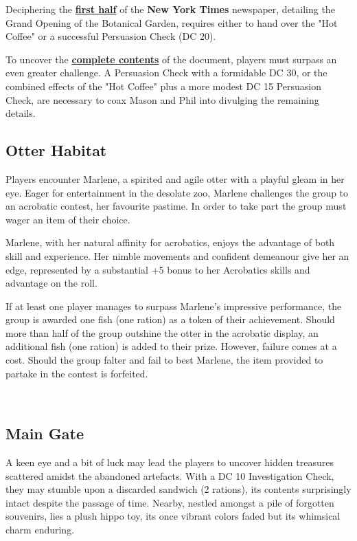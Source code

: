 Deciphering the \hyperref[sec:HalfDecipheredNewspaper]{\textbf{first half}} of the \textbf{New York Times} newspaper, detailing the Grand Opening of the Botanical Garden, requires either to hand over the "Hot Coffee" or a successful Persuasion Check (DC 20).

To uncover the \hyperref[sec:DecipheredNewspaper]{\textbf{complete contents}} of the document, players must surpass an even greater challenge. A Persuasion Check with a formidable DC 30, or the combined effects of the "Hot Coffee" plus a more modest DC 15 Persuasion Check, are necessary to coax Mason and Phil into divulging the remaining details.
\subsection*{ Otter Habitat}
Players encounter Marlene, a spirited and agile otter with a playful gleam in her eye. Eager for entertainment in the desolate zoo, Marlene challenges the group to an acrobatic contest, her favourite pastime. In order to take part the group must wager an item of their choice. 

Marlene, with her natural affinity for acrobatics, enjoys the advantage of both skill and experience. Her nimble movements and confident demeanour give her an edge, represented by a substantial +5 bonus to her Acrobatics skills and advantage on the roll.

If at least one player manages to surpass Marlene's impressive performance, the group is awarded one fish (one ration) as a token of their achievement. Should more than half of the group outshine the otter in the acrobatic display, an additional fish (one ration) is added to their prize. However, failure comes at a cost. Should the group falter and fail to best Marlene, the item provided to partake in the contest is forfeited.

\hfill\\\eject
\subsection*{ Main Gate}
A keen eye and a bit of luck may lead the players to uncover hidden treasures scattered amidst the abandoned artefacts. With a DC 10 Investigation Check, they may stumble upon a discarded sandwich (2 rations), its contents surprisingly intact despite the passage of time. Nearby, nestled amongst a pile of forgotten souvenirs, lies a plush hippo toy, its once vibrant colors faded but its whimsical charm enduring.

